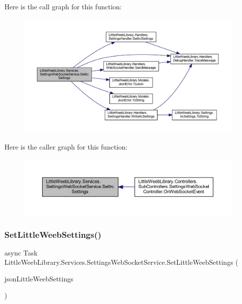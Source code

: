 Here is the call graph for this function\+:\nopagebreak
\begin{figure}[H]
\begin{center}
\leavevmode
\includegraphics[width=350pt]{class_little_weeb_library_1_1_services_1_1_settings_web_socket_service_a898cb4543b5abd273844405770687442_cgraph}
\end{center}
\end{figure}
Here is the caller graph for this function\+:\nopagebreak
\begin{figure}[H]
\begin{center}
\leavevmode
\includegraphics[width=350pt]{class_little_weeb_library_1_1_services_1_1_settings_web_socket_service_a898cb4543b5abd273844405770687442_icgraph}
\end{center}
\end{figure}
\mbox{\label{class_little_weeb_library_1_1_services_1_1_settings_web_socket_service_aa53e9a1723c0b2d607d2aa9db1991c3c}} 
\subsubsection{\texorpdfstring{Set\+Little\+Weeb\+Settings()}{SetLittleWeebSettings()}}
{\footnotesize\ttfamily async Task Little\+Weeb\+Library.\+Services.\+Settings\+Web\+Socket\+Service.\+Set\+Little\+Weeb\+Settings (\begin{DoxyParamCaption}\item[{J\+Object}]{json\+Little\+Weeb\+Settings }\end{DoxyParamCaption})}



